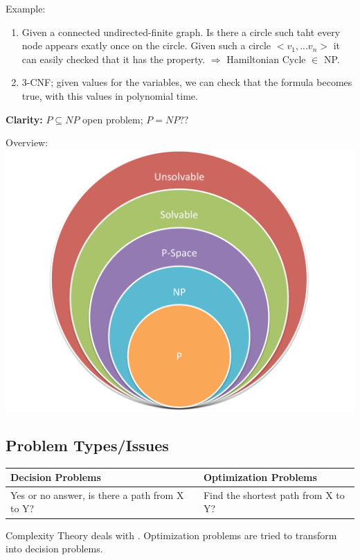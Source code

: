 \begin{example}
Example:
\begin{enumerate}
  \item Given a connected undirected-finite graph. Is there a circle such taht every node appears exatly once on the circle.
        Given such a circle $< v_{1},...v_{n}>$ it can easily checked that it has the property. $\Rightarrow$ Hamiltonian Cycle $\in$ 
        NP.
  \item 3-CNF; given values for the variables, we can check that the formula becomes true, with this values in polynomial time.
\end{enumerate}

\textbf{Clarity:} $P \subseteq NP$ open problem; $P = NP ??$

Overview: \\
\includegraphics[scale=0.3]{diagrams/comp_classes}
\end{example}

\subsection{Problem Types/Issues}

\begin{tabular}{p{5cm}|p{5cm}}
  \textbf{Decision Problems} & \textbf{Optimization Problems} \\
  \hline
  Yes or no answer, is there a path from X to Y? & Find the shortest path from X to Y?
\end{tabular}

\begin{definition}
  Complexity Theory deals with . Optimization problems are tried to transform into decision problems.
\end{definition}


